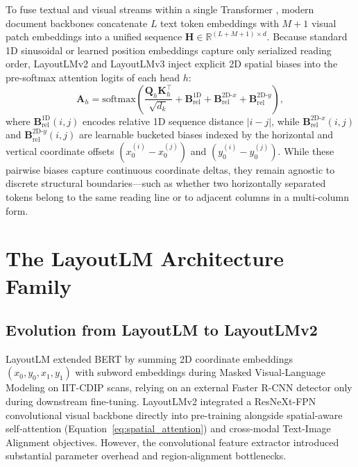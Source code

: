 To fuse textual and visual streams within a single Transformer \cite{vaswani2017attention}, modern document backbones concatenate $L$ text token embeddings with $M+1$ visual patch embeddings into a unified sequence $\mathbf{H} \in \mathbb{R}^{(L+M+1) \times d}$. Because standard 1D sinusoidal or learned position embeddings capture only serialized reading order, LayoutLMv2 \cite{xu2021layoutlmv2} and LayoutLMv3 \cite{huang2022layoutlmv3} inject explicit 2D spatial biases into the pre-softmax attention logits of each head $h$:
\begin{equation}
    \mathbf{A}_h = \text{softmax}\!\left( \frac{\mathbf{Q}_h \mathbf{K}_h^\top}{\sqrt{d_k}} + \mathbf{B}^{\text{1D}}_{\text{rel}} + \mathbf{B}^{\text{2D-}x}_{\text{rel}} + \mathbf{B}^{\text{2D-}y}_{\text{rel}} \right),
    \label{eq:spatial_attention}
\end{equation}
where $\mathbf{B}^{\text{1D}}_{\text{rel}}(i,j)$ encodes relative 1D sequence distance $|i - j|$, while $\mathbf{B}^{\text{2D-}x}_{\text{rel}}(i,j)$ and $\mathbf{B}^{\text{2D-}y}_{\text{rel}}(i,j)$ are learnable bucketed biases indexed by the horizontal and vertical coordinate offsets $(x_0^{(i)} - x_0^{(j)})$ and $(y_0^{(i)} - y_0^{(j)})$. While these pairwise biases capture continuous coordinate deltas, they remain agnostic to discrete structural boundaries—such as whether two horizontally separated tokens belong to the same reading line or to adjacent columns in a multi-column form.

\section{The LayoutLM Architecture Family}
\label{sec:layoutlm_evolution}

\subsection{Evolution from LayoutLM to LayoutLMv2}
\label{subsec:layoutlm_v1_v2}

LayoutLM \cite{xu2020layoutlm} extended BERT \cite{devlin2019bert} by summing 2D coordinate embeddings $(x_0, y_0, x_1, y_1)$ with subword embeddings during Masked Visual-Language Modeling on IIT-CDIP scans, relying on an external Faster R-CNN detector only during downstream fine-tuning. LayoutLMv2 \cite{xu2021layoutlmv2} integrated a ResNeXt-FPN convolutional visual backbone directly into pre-training alongside spatial-aware self-attention (Equation~\ref{eq:spatial_attention}) and cross-modal Text-Image Alignment objectives. However, the convolutional feature extractor introduced substantial parameter overhead and region-alignment bottlenecks.

